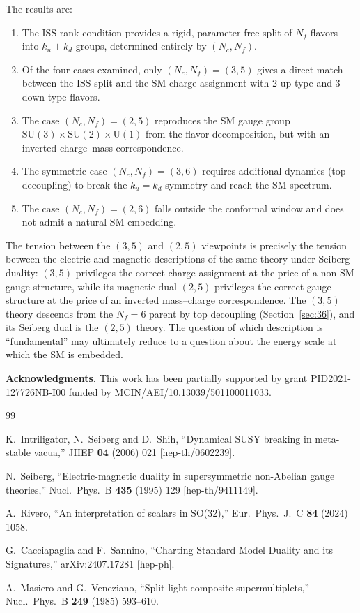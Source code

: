\documentclass[11pt,a4paper]{article}
\newcommand{\Nf}{N_{\!f}}
\newcommand{\Nc}{N_{\!c}}
\begin{document}
The results are:
\begin{enumerate}
\item The ISS rank condition provides a rigid, parameter-free split
  of $\Nf$ flavors into $k_u + k_d$ groups, determined entirely by
  $(\Nc, \Nf)$.
\item Of the four cases examined, only $(\Nc,\Nf) = (3,5)$ gives a
  direct match between the ISS split and the SM charge assignment
  with 2 up-type and 3 down-type flavors.
\item The case $(\Nc,\Nf) = (2,5)$ reproduces the SM gauge group
  $\mathrm{SU}(3) \times \mathrm{SU}(2) \times \mathrm{U}(1)$ from
  the flavor decomposition, but with an inverted charge--mass
  correspondence.
\item The symmetric case $(\Nc,\Nf) = (3,6)$ requires additional
  dynamics (top decoupling) to break the $k_u = k_d$ symmetry and
  reach the SM spectrum.
\item The case $(\Nc,\Nf) = (2,6)$ falls outside the conformal
  window and does not admit a natural SM embedding.
\end{enumerate}

\noindent
The tension between the $(3,5)$ and $(2,5)$ viewpoints is
precisely the tension between the electric and magnetic descriptions
of the same theory under Seiberg duality: $(3,5)$ privileges
the correct charge assignment at the price of a non-SM gauge
structure, while its magnetic dual $(2,5)$ privileges the correct
gauge structure at the price of an inverted mass--charge
correspondence.
The $(3,5)$ theory descends from the $\Nf = 6$ parent by top
decoupling (Section~\ref{sec:36}), and its Seiberg dual is the
$(2,5)$ theory.  The question of which description is
``fundamental'' may ultimately reduce to a question about the
energy scale at which the SM is embedded.

\bigskip
\noindent\textbf{Acknowledgments.}
This work has been partially supported by grant
PID2021-127726NB-I00 funded by MCIN/AEI/10.13039/501100011033.

\begin{thebibliography}{99}

K.~Intriligator, N.~Seiberg and D.~Shih,
``Dynamical SUSY breaking in meta-stable vacua,''
JHEP \textbf{04} (2006) 021
[hep-th/0602239].

N.~Seiberg,
``Electric-magnetic duality in supersymmetric non-Abelian gauge theories,''
Nucl.\ Phys.\ B \textbf{435} (1995) 129
[hep-th/9411149].

A.~Rivero,
``An interpretation of scalars in SO(32),''
Eur.\ Phys.\ J.\ C \textbf{84} (2024) 1058.

G.~Cacciapaglia and F.~Sannino,
``Charting Standard Model Duality and its Signatures,''
arXiv:2407.17281 [hep-ph].

A.~Masiero and G.~Veneziano,
``Split light composite supermultiplets,''
Nucl.\ Phys.\ B \textbf{249} (1985) 593--610.

\end{thebibliography}
\end{document}
